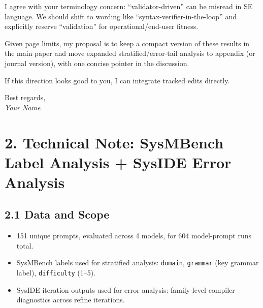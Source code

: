 \documentclass[11pt]{article}
\begin{document}
\noindent
I agree with your terminology concern: ``validator-driven'' can be misread in SE language. We should shift to wording like ``syntax-verifier-in-the-loop'' and explicitly reserve ``validation'' for operational/end-user fitness.

\medskip
\noindent
Given page limits, my proposal is to keep a compact version of these results in the main paper and move expanded stratified/error-tail analysis to appendix (or journal version), with one concise pointer in the discussion.

\medskip
\noindent
If this direction looks good to you, I can integrate tracked edits directly.

\medskip
\noindent
Best regards,\\
\textit{Your Name}

\newpage
\section*{2. Technical Note: SysMBench Label Analysis + SysIDE Error Analysis}

\subsection*{2.1 Data and Scope}
\begin{itemize}
    \item 151 unique prompts, evaluated across 4 models, for 604 model-prompt runs total.
    \item SysMBench labels used for stratified analysis: \texttt{domain}, \texttt{grammar} (key grammar label), \texttt{difficulty} (1--5).
    \item SysIDE iteration outputs used for error analysis: family-level compiler diagnostics across refine iterations.
\end{itemize}
\end{document}
